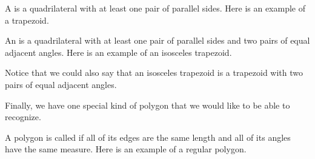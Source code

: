 \documentclass{ximera}
\begin{document}
\begin{definition}
	A  is a quadrilateral with at least one pair of parallel sides. Here is an example of a trapezoid.
	\begin{image}
	\end{image}
\end{definition}


\begin{definition}
	An  is a quadrilateral with at least one pair of parallel sides and two pairs of equal adjacent angles. Here is an example of an isosceles trapezoid.
	\begin{image}
	\end{image}
\end{definition}
Notice that we could also say that an isosceles trapezoid is a trapezoid with two pairs of equal adjacent angles.





Finally, we have one special kind of polygon that we would like to be able to recognize.
\begin{definition}
	A polygon is called  if all of its edges are the same length and all of its angles have the same measure. Here is an example of a regular polygon.
	\begin{image}
	\end{image}
\end{definition}
\end{document}

